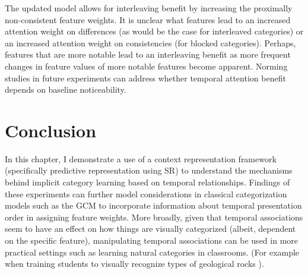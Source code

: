 The updated model allows for interleaving benefit by increasing the proximally non-consistent feature weights. It is unclear what features lead to an increased attention weight on differences (as would be the case for interleaved categories) or an increased attention weight on consistencies (for blocked categories). Perhaps, features that are more notable lead to an interleaving benefit as more frequent changes in feature values of more notable features become apparent. Norming studies in future experiments can address whether temporal attention benefit depends on baseline noticeability. 

\section{Conclusion}
In this chapter, I demonstrate a use of a context representation framework (specifically predictive representation using SR) to understand the mechanisms behind implicit category learning based on temporal relationships. Findings of these experiments can further model considerations in classical categorization models such as the GCM to incorporate information about temporal presentation order in assigning feature weights. More broadly, given that temporal associations seem to have an effect on how things are visually categorized (albeit, dependent on the specific feature), manipulating temporal associations can be used in more practical settings such as learning natural categories in classrooms. (For example when training students to visually recognize types of geological rocks \parencite{nosofsky2018toward, nosofsky2017learning}). 